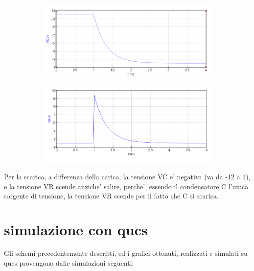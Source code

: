 \documentclass[12pt]{article}
\begin{document}
\begin{figure}[h!]
  \centering
  \begin{subfigure}[b]{0.49\linewidth}
    \includegraphics[width=\linewidth]{data/scarica-VC.png}
  \end{subfigure}
  \begin{subfigure}[b]{0.49\linewidth}
    \includegraphics[width=\linewidth]{data/scarica-VR.png}
  \end{subfigure}
\end{figure}

Per la scarica, a differenza della carica, la tensione VC e' negativa (va da -12 a 1), e la tensione VR scende anziche' salire, perche', essendo il condensatore C l'unica sorgente di tensione, la tensione VR scende per il fatto che C si scarica.

\newpage

\section*{simulazione con qucs}
Gli schemi precedentemente descritti, ed i grafici ottenuti, realizzati e simulati su qucs provengono dalle simulazioni seguenti:  
\end{document}
